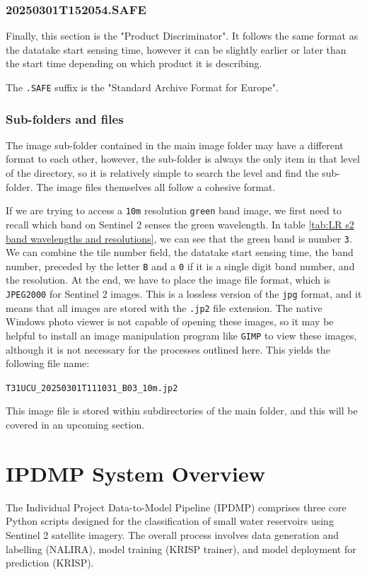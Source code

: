 \subsubsection{20250301T152054.SAFE}
Finally, this section is the "Product Discriminator". It follows the same format as the datatake start sensing time, however it can be slightly earlier or later than the start time depending on which product it is describing. 

The \verb|.SAFE| suffix is the "Standard Archive Format for Europe". 

\subsubsection{Sub-folders and files}
The image sub-folder contained in the main image folder may have a different format to each other, however, the sub-folder is always the only item in that level of the directory, so it is relatively simple to search the level and find the sub-folder. The image files themselves all follow a cohesive format. 

If we are trying to access a \verb|10m| resolution \verb|green| band image, we first need to recall which band on Sentinel 2 senses the green wavelength. In table \ref{tab:LR s2 band wavelengths and resolutions}, we can see that the green band is number \verb|3|. We can combine the tile number field, the datatake start sensing time, the band number, preceded by the letter \verb|B| and a \verb|0| if it is a single digit band number, and the resolution. At the end, we have to place the image file format, which is \verb|JPEG2000| for Sentinel 2 images. This is a lossless version of the \verb|jpg| format, and it means that all images are stored with the \verb|.jp2| file extension. The native Windows photo viewer is not capable of opening these images, so it may be helpful to install an image manipulation program like \verb|GIMP| to view these images, although it is not necessary for the processes outlined here. This yields the following file name: 

\verb|T31UCU_20250301T111031_B03_10m.jp2|

This image file is stored within subdirectories of the main folder, and this will be covered in an upcoming section. 

\section{IPDMP System Overview}
The Individual Project Data-to-Model Pipeline (IPDMP) comprises three core Python scripts designed for the classification of small water reservoirs using Sentinel 2 satellite imagery. The overall process involves data generation and labelling (NALIRA), model training (KRISP trainer), and model deployment for prediction (KRISP).


